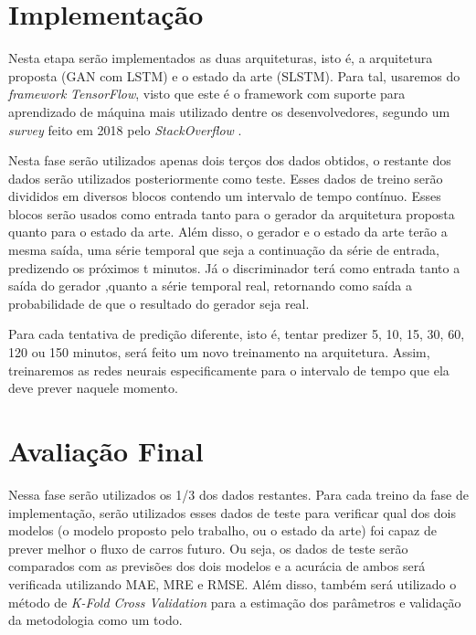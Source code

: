 \section{Implementação}

Nesta etapa serão implementados as duas arquiteturas, isto é, a arquitetura proposta (\acrshort{GAN} com \acrshort{LSTM}) e o estado da arte (\acrshort{SLSTM}). Para tal, usaremos do \textit{framework} \textit{TensorFlow}, visto que este é o framework com suporte para aprendizado de máquina mais utilizado dentre os desenvolvedores, segundo um \textit{survey} feito em 2018 pelo \textit{StackOverflow} \cite{stack_2018}.

Nesta fase serão utilizados apenas dois terços dos dados obtidos, o restante dos dados serão utilizados posteriormente como teste. Esses dados de treino serão divididos em diversos blocos contendo um intervalo de tempo contínuo. Esses blocos serão usados como entrada tanto para o gerador da arquitetura proposta quanto para o estado da arte. Além disso, o gerador e o estado da arte terão a mesma saída, uma série temporal que seja a continuação da série de entrada, predizendo os próximos t minutos. Já o discriminador terá como entrada tanto a saída do gerador ,quanto a série temporal real, retornando como saída a probabilidade de que o resultado do gerador seja real.

Para cada tentativa de predição diferente, isto é, tentar predizer 5, 10, 15, 30, 60, 120 ou 150 minutos, será feito um novo treinamento na arquitetura. Assim, treinaremos as redes neurais especificamente para o intervalo de tempo que ela deve prever naquele momento.

\section{Avaliação Final}

Nessa fase serão utilizados os 1/3 dos dados restantes. Para cada treino da fase de implementação, serão utilizados esses dados de teste para verificar qual dos dois modelos (o modelo proposto pelo trabalho, ou o estado da arte) foi capaz de prever melhor o fluxo de carros futuro. Ou seja, os dados de teste serão comparados com as previsões dos dois modelos e a acurácia de ambos será verificada utilizando \acrshort{MAE}, \acrshort{MRE} e \acrshort{RMSE}. Além disso, também será utilizado o método de \textit{K-Fold Cross Validation} para a estimação dos parâmetros e validação da metodologia como um todo.

